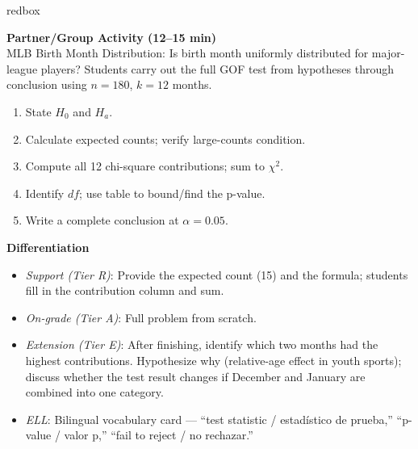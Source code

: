 \documentclass[10pt]{article}
\begin{document}
\begin{skillbox}{redbox}
\begin{minipage}[t]{0.48\linewidth}
    \textbf{Partner/Group Activity (12--15 min)}\\
    MLB Birth Month Distribution: Is birth month uniformly distributed
    for major-league players? Students carry out the full GOF test from
    hypotheses through conclusion using $n = 180$, $k = 12$ months.

    \begin{enumerate}
        \item State $H_0$ and $H_a$.
        \item Calculate expected counts; verify large-counts condition.
        \item Compute all 12 chi-square contributions; sum to $\chi^2$.
        \item Identify $df$; use table to bound/find the p-value.
        \item Write a complete conclusion at $\alpha = 0.05$.
    \end{enumerate}
\end{minipage}
\hfill
\begin{minipage}[t]{0.48\linewidth}
    \textbf{Differentiation}
    \begin{itemize}
        \item \textit{Support (Tier R)}: Provide the expected count (15) and the
              formula; students fill in the contribution column and sum.
        \item \textit{On-grade (Tier A)}: Full problem from scratch.
        \item \textit{Extension (Tier E)}: After finishing, identify which two
              months had the highest contributions. Hypothesize why (relative-age
              effect in youth sports); discuss whether the test result changes
              if December and January are combined into one category.
        \item \textit{ELL}: Bilingual vocabulary card ---
              ``test statistic / estadístico de prueba,''
              ``p-value / valor p,''
              ``fail to reject / no rechazar.''
    \end{itemize}
\end{minipage}
\end{skillbox}
\end{document}
